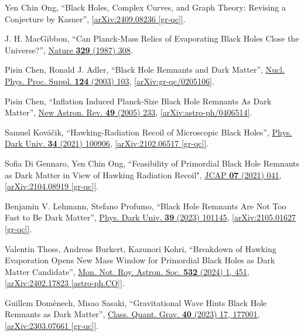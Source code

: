\documentclass[12pt,preprintnumbers, floatfix, preprintnumbers, letterpaper, superscriptaddress,nofootinbib]{revtex4-2}
\begin{document}
\begin{thebibliography}{99}
Yen Chin Ong, ``Black Holes, Complex Curves, and Graph Theory: Revising a Conjecture by Kasner'', \href{https://arxiv.org/abs/2409.08236}{[arXiv:2409.08236 [gr-qc]]}.

J. H. MacGibbon, ``Can Planck-Mass Relics of Evaporating Black Holes Close the Universe?'', {\hypersetup{urlcolor=vividviolet}\href{https://www.nature.com/articles/329308a0}{Nature \textbf{329} (1987) 308}}.

Pisin Chen, Ronald J. Adler, ``Black Hole Remnants and Dark Matter'', {\hypersetup{urlcolor=vividviolet}\href{https://www.sciencedirect.com/science/article/abs/pii/S0920563203020887?via\%3Dihub}{Nucl. Phys. Proc. Suppl. \textbf{124} (2003) 103}}, \href{https://arxiv.org/abs/gr-qc/0205106}{[arXiv:gr-qc/0205106]}.

Pisin Chen, ``Inflation Induced Planck-Size Black Hole Remnants As Dark Matter'', {\hypersetup{urlcolor=vividviolet}\href{https://www.sciencedirect.com/science/article/abs/pii/S1387647305000333?via\%3Dihub}{New Astron. Rev. \textbf{49} (2005) 233}}, \href{https://arxiv.org/abs/astro-ph/0406514}{[arXiv:astro-ph/0406514]}.

Samuel Kováčik, ``Hawking-Radiation Recoil of Microscopic Black Holes'', {\hypersetup{urlcolor=vividviolet}\href{https://www.sciencedirect.com/science/article/abs/pii/S2212686421001333?via\%3Dihub}{Phys. Dark Univ. \textbf{34} (2021) 100906}}, \href{https://arxiv.org/abs/2102.06517}{[arXiv:2102.06517 [gr-qc]]}.

Sofia Di Gennaro, Yen Chin Ong, ``Feasibility of Primordial Black Hole Remnants as Dark Matter in View of Hawking Radiation Recoil",  {\hypersetup{urlcolor=vividviolet}\href{https://iopscience.iop.org/article/10.1088/1475-7516/2021/07/041}{JCAP \textbf{07} (2021) 041}}, \href{https://arxiv.org/abs/2104.08919}{[arXiv:2104.08919 [gr-qc]]}.

Benjamin V. Lehmann, Stefano Profumo, ``Black Hole Remnants Are Not Too Fast to Be Dark Matter'', {\hypersetup{urlcolor=vividviolet}\href{https://www.sciencedirect.com/science/article/pii/S2212686422001182?via\%3Dihub}{Phys. Dark Univ. \textbf{39} (2023) 101145}}, \href{https://arxiv.org/abs/2105.01627}{[arXiv:2105.01627 [gr-qc]]}.

Valentin Thoss, Andreas Burkert, Kazunori Kohri, ``Breakdown of Hawking Evaporation Opens New Mass Window for Primordial Black Holes as Dark Matter Candidate'', {\hypersetup{urlcolor=vividviolet}\href{https://academic.oup.com/mnras/article/532/1/451/7656972}{Mon. Not. Roy. Astron. Soc. \textbf{532} (2024) 1, 451}}, \href{https://arxiv.org/abs/2402.17823}{[arXiv:2402.17823 [astro-ph.CO]]}.

Guillem Domènech, Misao Sasaki, ``Gravitational Wave Hints Black Hole Remnants as Dark Matter'',  {\hypersetup{urlcolor=vividviolet}\href{https://iopscience.iop.org/article/10.1088/1361-6382/ace493}{Class. Quant. Grav. \textbf{40} (2023) 17, 177001}}, \href{https://arxiv.org/abs/2303.07661}{[arXiv:2303.07661 [gr-qc]]}.

\end{thebibliography}
\end{document}
